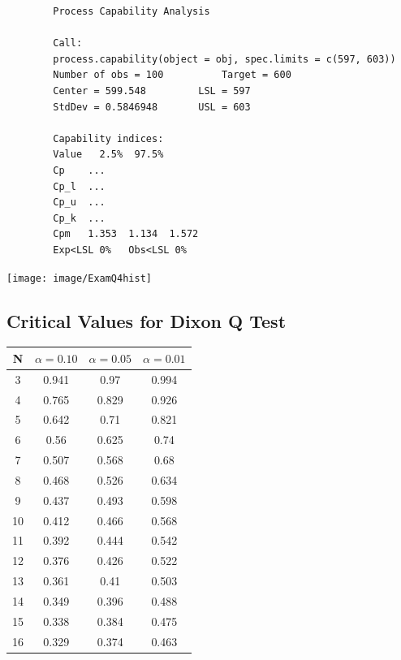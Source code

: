\documentclass[a4paper,12pt]{article}
\begin{document}
\begin{itemize}
	
	\newpage
	\begin{framed}
		\begin{verbatim}
		Process Capability Analysis
		
		Call:
		process.capability(object = obj, spec.limits = c(597, 603))
		Number of obs = 100          Target = 600
		Center = 599.548         LSL = 597
		StdDev = 0.5846948       USL = 603
		
		Capability indices:
		Value   2.5%  97.5%
		Cp    ...
		Cp_l  ...
		Cp_u  ...
		Cp_k  ...
		Cpm   1.353  1.134  1.572
		Exp<LSL 0%   Obs<LSL 0%
		\end{verbatim}
	\end{framed}
	
	
	
	\begin{center}
		\texttt{[image: image/ExamQ4hist]}
	\end{center}
	\newpage
\end{itemize}

\newpage
\subsection*{Critical Values for Dixon Q Test}
\begin{center}
	\begin{tabular}{|c|c|c|c|}
		\hline  N  & $\alpha=0.10$  & $\alpha=0.05$  & $\alpha=0.01$  \\ \hline
		3  & 0.941 & 0.97  & 0.994 \\ \hline
		4  & 0.765 & 0.829 & 0.926 \\ \hline
		5  & 0.642 & 0.71  & 0.821 \\ \hline
		6  & 0.56  & 0.625 & 0.74  \\ \hline
		7  & 0.507 & 0.568 & 0.68  \\ \hline
		8  & 0.468 & 0.526 & 0.634 \\ \hline
		9  & 0.437 & 0.493 & 0.598 \\ \hline
		10 & 0.412 & 0.466 & 0.568 \\ \hline
		11 & 0.392 & 0.444 & 0.542 \\ \hline
		12 & 0.376 & 0.426 & 0.522 \\ \hline
		13 & 0.361 & 0.41  & 0.503 \\ \hline
		14 & 0.349 & 0.396 & 0.488 \\ \hline
		15 & 0.338 & 0.384 & 0.475 \\ \hline
		16 & 0.329 & 0.374 & 0.463 \\ \hline
	\end{tabular} 
\end{center}
\end{document}
